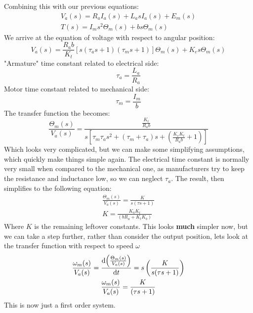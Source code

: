 \documentclass[class=report, crop=false, 12pt,a4paper, tikz, border=4mm]{standalone}
\begin{document}
Combining this with our previous equations:
\begin{gather}
  V_a (s) = R_a I_a (s)+L_a s I_a (s) + E_m (s)\\
  T(s) = I_m s^2 \Theta_m (s) + bs\Theta_m (s)
\end{gather}
We arrive at the equation of voltage with respect to angular position:
\begin{equation}
  V_a (s) = \frac{R_a b}{K_t} \left[ s(\tau_a s +1)(\tau_m s +1)\right] \Theta_m (s) + K_e s\Theta_m (s)
\end{equation}
"Armature" time constant related to electrical side:
\begin{equation}
  \tau_a = \frac{L_a}{R_a}
\end{equation}
Motor time constant related to mechanical side:
\begin{equation}
  \tau_m = \frac{I_m}{b}
\end{equation}
The transfer function the becomes:
\begin{equation}
  \frac{\Theta_m(s)}{V_a(s)} = \frac{\frac{K_t}{R_a b}}{s\left[ \tau_m \tau_a s^2 + (\tau_m + \tau_a)s + \left( \frac{K_e K_t}{R_a b} + 1 \right)  \right]}
\end{equation}
Which looks very complicated, but we can make some simplifying assumptions, which quickly make things simple again. The electrical time constant is normally very small when compared to the mechanical one, as manufacturers try to keep the resistance and inductance low, so we can neglect $\tau_a$. The result, then simplifies to the following equation:
\begin{gather}
  \frac{\Theta_m(s)}{V_a(s)} = \frac{K}{s(\tau s + 1)}\\
  K = \frac{K_a K_t}{(bR_a + K_t K_b)}
\end{gather}
Where $K$ is the remaining leftover constants. This looks \textbf{much} simpler now, but we can take a step further, rather than consider the output position, lets look at the transfer function with respect to speed $\omega$
\begin{gather}
  \frac{\omega_m (s)}{V_a (s)} = \frac{\dif \left( \frac{\Theta_m (s)}{V_a (s)} \right)}{\dif t} = s \left( \frac{K}{s(\tau s +1)} \right)\\
  \frac{\omega_m (s)}{V_a (s)} = \frac{K}{(\tau s +1)}
\end{gather}
This is now just a first order system.
\end{document}
